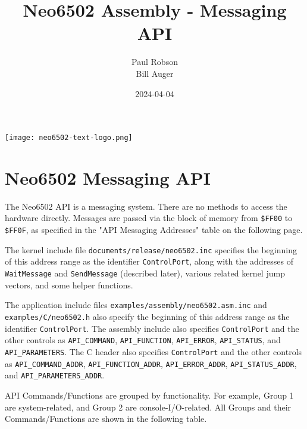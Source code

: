 \documentclass[12pt]{article}
\title{Neo6502 Assembly - Messaging API}
\author{Paul Robson \\ Bill Auger}
\date{2024-04-04}
\newcommand{\MonoSp}[1] {\fontsize{10pt}{10pt}\selectfont\texttt{#1}\normalsize}
\begin{document}
\maketitle

\begin{center}
  \texttt{[image: neo6502-text-logo.png]}
\end{center}

\tableofcontents


\pagebreak


\section{Neo6502 Messaging API}\label{api}

The Neo6502 API is a messaging system.
There are no methods to access the hardware directly.
Messages are passed via the block of memory from \MonoSp{\$FF00} to \MonoSp{\$FF0F},
as specified in the "API Messaging Addresses" table on the following page.
\newline

The kernel include file \MonoSp{documents/release/neo6502.inc}
specifies the beginning of this address range as the identifier \MonoSp{ControlPort},
along with the addresses of \MonoSp{WaitMessage} and \MonoSp{SendMessage} (described later),
various related kernel jump vectors, and some helper functions.
\newline

The application include files \MonoSp{examples/assembly/neo6502.asm.inc}
and \MonoSp{examples/C/neo6502.h}
also specify the beginning of this address range as the identifier \MonoSp{ControlPort}.
The assembly include also specifies \MonoSp{ControlPort} and the other controls as
\MonoSp{API\_COMMAND}, \MonoSp{API\_FUNCTION}, \MonoSp{API\_ERROR},
\MonoSp{API\_STATUS}, and \MonoSp{API\_PARAMETERS}.
The C header also specifies \MonoSp{ControlPort} and the other controls as
\MonoSp{API\_COMMAND\_ADDR}, \MonoSp{API\_FUNCTION\_ADDR},
\MonoSp{API\_ERROR\_ADDR}, \MonoSp{API\_STATUS\_ADDR},
and \MonoSp{API\_PARAMETERS\_ADDR}.
\newline

API Commands/Functions are grouped by functionality.
For example, Group 1 are system-related, and Group 2 are console-I/O-related.
All Groups and their Commands/Functions are shown in the following table.
\newline
\end{document}
